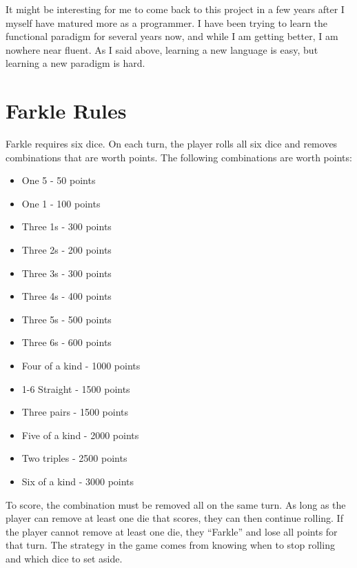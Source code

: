 \documentclass{article}
\begin{document}
It might be interesting for me to come back to this project in a few years after
I myself have matured more as a programmer.  I have been trying to learn the
functional paradigm for several years now, and while I am getting better, I am
nowhere near fluent.  As I said above, learning a new language is easy, but
learning a new paradigm is hard.




\appendix
\section{Farkle Rules}
\label{sec:farklerules}

Farkle requires six dice.  On each turn, the player rolls all six dice and
removes combinations that are worth points.  The following combinations are
worth points:

\begin{itemize}
\item One 5 - 50 points
\item One 1 - 100 points
\item Three 1s - 300 points
\item Three 2s - 200 points
\item Three 3s - 300 points
\item Three 4s - 400 points
\item Three 5s - 500 points
\item Three 6s - 600 points
\item Four of a kind - 1000 points
\item 1-6 Straight   - 1500 points
\item Three pairs    - 1500 points
\item Five of a kind - 2000 points
\item Two triples    - 2500 points
\item Six of a kind  - 3000 points
\end{itemize}

To score, the combination must be removed all on the same turn.  As long as the
player can remove at least one die that scores, they can then continue rolling.
If the player cannot remove at least one die, they ``Farkle'' and lose all
points for that turn.  The strategy in the game comes from knowing when to stop
rolling and which dice to set aside.
\end{document}
